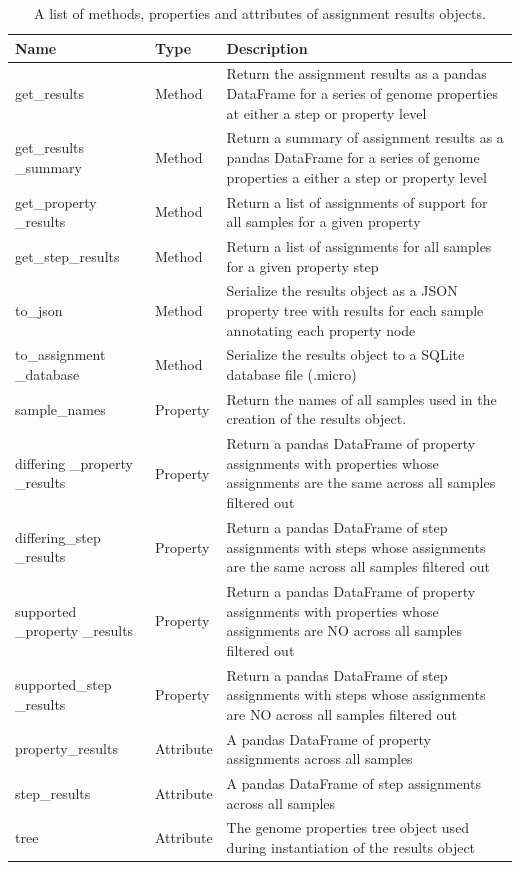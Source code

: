 \begin{longtable}{|p{2.7cm}|p{2cm}|p{10cm}|}
\caption{A list of methods, properties and attributes of assignment results objects.}
\label{tab:results-object}\\
\hline
\textbf{Name} & \textbf{Type} & \textbf{Description} \\ \hline
\endfirsthead
%
\endhead
%
get\_results & Method & Return the assignment results as a pandas DataFrame for a series of genome properties at either a step or property level \\ \hline
get\_results \_summary & Method & Return a summary of assignment results as a pandas DataFrame for a series of genome properties a either a step or property level \\ \hline
get\_property \_results & Method & Return a list of assignments of support for all samples for a given property \\ \hline
get\_step\_results & Method & Return a list of assignments for all samples for a given property step \\ \hline
to\_json & Method & Serialize the results object as a JSON property tree with results for each sample annotating each property node \\ \hline
to\_assignment \_database & Method & Serialize the results object to a SQLite database file (.micro) \\ \hline
sample\_names & Property & Return the names of all samples used in the creation of the results object. \\ \hline
differing \_property \_results & Property & Return a pandas DataFrame of property assignments with properties whose assignments are the same across all samples filtered out \\ \hline
differing\_step \_results & Property & Return a pandas DataFrame of step assignments with steps whose assignments are the same across all samples filtered out \\ \hline
supported \_property \_results & Property & Return a pandas DataFrame of property assignments with properties whose assignments are NO across all samples filtered out \\ \hline
supported\_step \_results & Property & Return a pandas DataFrame of step assignments with steps whose assignments are NO across all samples filtered out \\ \hline
property\_results & Attribute & A pandas DataFrame of property assignments across all samples \\ \hline
step\_results & Attribute & A pandas DataFrame of step assignments across all samples \\ \hline
tree & Attribute & The genome properties tree object used during instantiation of the results object \\ \hline
\end{longtable}

